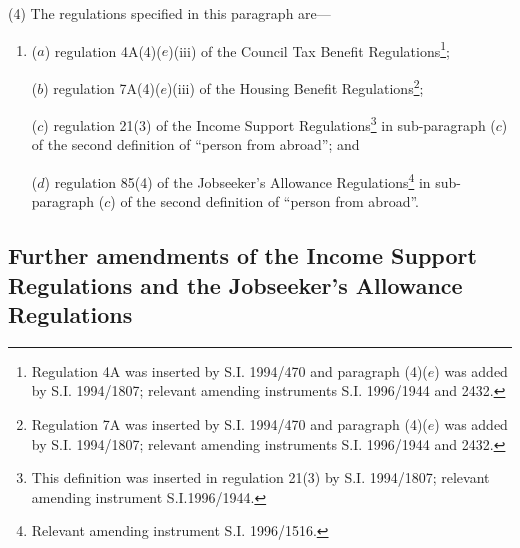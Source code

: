 \documentclass[12pt,a4paper]{article}
\begin{document}
(4) The regulations specified in this paragraph are—
\begin{enumerate}\item[]
($a$) regulation 4A(4)($e$)(iii)  of the Council Tax Benefit Regulations\footnote{\frenchspacing Regulation 4A was inserted by S.I. 1994/470 and paragraph (4)($e$) was added by S.I. 1994/1807; relevant amending instruments S.I. 1996/1944 and 2432.};

($b$) regulation 7A(4)($e$)(iii)  of the Housing Benefit Regulations\footnote{\frenchspacing Regulation 7A was inserted by S.I. 1994/470 and paragraph (4)($e$) was added by S.I. 1994/1807; relevant amending instruments S.I. 1996/1944 and 2432.};

($c$) regulation 21(3) of the Income Support Regulations\footnote{\frenchspacing This definition was inserted in regulation 21(3) by S.I. 1994/1807; relevant amending instrument S.I.1996/1944.} in sub-paragraph ($c$)  of the second definition of “person from abroad”; and

($d$) regulation 85(4) of the Jobseeker’s Allowance Regulations\footnote{\frenchspacing Relevant amending instrument S.I. 1996/1516.} in sub-paragraph ($c$)  of the second definition of “person from abroad”.
\end{enumerate}

\subsection[19. Further amendments of the Income Support Regulations and the Jobseeker’s Allowance Regulations]{Further amendments of the Income Support Regulations and the Jobseeker’s Allowance Regulations}
\end{document}
